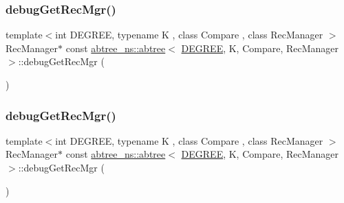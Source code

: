\mbox{\label{classabtree__ns_1_1abtree_a6fa33b8da342f9df9d17e2efeb4fd753}} 
\subsubsection{\texorpdfstring{debug\+Get\+Rec\+Mgr()}{debugGetRecMgr()}\hspace{0.1cm}{\footnotesize\ttfamily [1/2]}}
{\footnotesize\ttfamily template$<$int D\+E\+G\+R\+EE, typename K , class Compare , class Rec\+Manager $>$ \\
Rec\+Manager$\ast$ const \hyperlink{classabtree__ns_1_1abtree}{abtree\+\_\+ns\+::abtree}$<$ \hyperlink{brown__sigouin__abtree__kcas_2adapter_8h_a5d88b17d70c985f2f2b8e987037fd6dd}{D\+E\+G\+R\+EE}, K, Compare, Rec\+Manager $>$\+::debug\+Get\+Rec\+Mgr (\begin{DoxyParamCaption}{ }\end{DoxyParamCaption})\hspace{0.3cm}{\ttfamily [inline]}}

\mbox{\label{classabtree__ns_1_1abtree_a6fa33b8da342f9df9d17e2efeb4fd753}} 
\subsubsection{\texorpdfstring{debug\+Get\+Rec\+Mgr()}{debugGetRecMgr()}\hspace{0.1cm}{\footnotesize\ttfamily [2/2]}}
{\footnotesize\ttfamily template$<$int D\+E\+G\+R\+EE, typename K , class Compare , class Rec\+Manager $>$ \\
Rec\+Manager$\ast$ const \hyperlink{classabtree__ns_1_1abtree}{abtree\+\_\+ns\+::abtree}$<$ \hyperlink{brown__sigouin__abtree__kcas_2adapter_8h_a5d88b17d70c985f2f2b8e987037fd6dd}{D\+E\+G\+R\+EE}, K, Compare, Rec\+Manager $>$\+::debug\+Get\+Rec\+Mgr (\begin{DoxyParamCaption}{ }\end{DoxyParamCaption})\hspace{0.3cm}{\ttfamily [inline]}}

